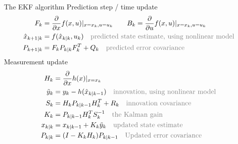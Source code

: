\documentclass[presentation,aspectratio=169]{beamer}
\begin{document}
\begin{frame}[label=sec-2-4]{The EKF algorithm}
Prediction step / time update
\begin{align*} 
F_k &= \frac{\partial}{\partial x}f(x,u)|_{x=x_k, u=u_k}\qquad  
B_k = \frac{\partial}{\partial u}f(x,u)|_{x=x_k, u=u_k}\\
\hat{x}_{k+1|k} &= f(\hat{x}_{k|k}, u_k) \quad \text{\textcolor{gray}{predicted state estimate, using nonlinear model}}\\
P_{k+1|k} &= F_kP_{k|k}F_k^T + Q_k \quad \text{\textcolor{gray}{predicted error covariance}}
\end{align*}
Measurement update
\begin{align*}
H_k &= \frac{\partial}{\partial x}h(x)|_{x=x_k}\\
\tilde{y}_k &= y_k - h(\hat{x}_{k|k-1}) \quad \text{\textcolor{gray}{innovation, using nonlinear model}}\\
S_k &= H_kP_{k|k-1}H_k^T + R_k \quad \text{\textcolor{gray}{innovation covariance}}\\
K_k &= P_{k|k-1}H_k^TS_k^{-1}\quad \text{\textcolor{gray}{the Kalman gain}}\\
x_{k|k} &= x_{k|k-1} + K_k\tilde{y}_k \quad \text{\textcolor{gray}{updated state estimate}}\\
P_{k|k} &= (I - K_kH_k)P_{k|k-1} \quad \text{\textcolor{gray}{Updated error covariance}}
\end{align*}
\end{frame}
\end{document}

